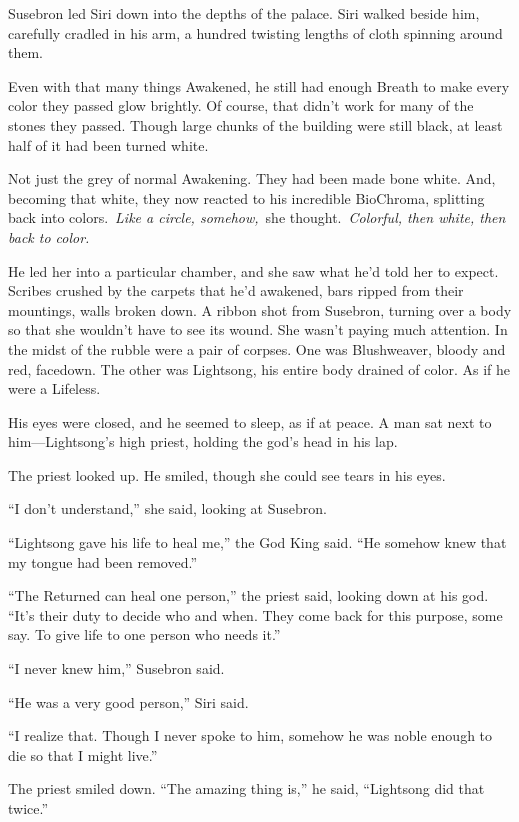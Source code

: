 \orn

Susebron led Siri down into the depths of the palace. Siri walked beside him, carefully cradled in his arm, a hundred twisting lengths of cloth spinning around them.

Even with that many things Awakened, he still had enough Breath to make every color they passed glow brightly. Of course, that didn’t work for many of the stones they passed. Though large chunks of the building were still black, at least half of it had been turned white.

Not just the grey of normal Awakening. They had been made bone white. And, becoming that white, they now reacted to his incredible BioChroma, splitting back into colors.~\textit{Like a circle, somehow,}~she thought.~\textit{Colorful, then white, then back to color.}

He led her into a particular chamber, and she saw what he’d told her to expect. Scribes crushed by the carpets that he’d awakened, bars ripped from their mountings, walls broken down. A ribbon shot from Susebron, turning over a body so that she wouldn’t have to see its wound. She wasn’t paying much attention. In the midst of the rubble were a pair of corpses. One was Blushweaver, bloody and red, facedown. The other was Lightsong, his entire body drained of color. As if he were a Lifeless.

His eyes were closed, and he seemed to sleep, as if at peace. A man sat next to him—Lightsong’s high priest, holding the god’s head in his lap.

The priest looked up. He smiled, though she could see tears in his eyes.

“I don’t understand,” she said, looking at Susebron.

“Lightsong gave his life to heal me,” the God King said. “He somehow knew that my tongue had been removed.”

“The Returned can heal one person,” the priest said, looking down at his god. “It’s their duty to decide who and when. They come back for this purpose, some say. To give life to one person who needs it.”

“I never knew him,” Susebron said.

“He was a very good person,” Siri said.

“I realize that. Though I never spoke to him, somehow he was noble enough to die so that I might live.”

The priest smiled down. “The amazing thing is,” he said, “Lightsong did that twice.”

